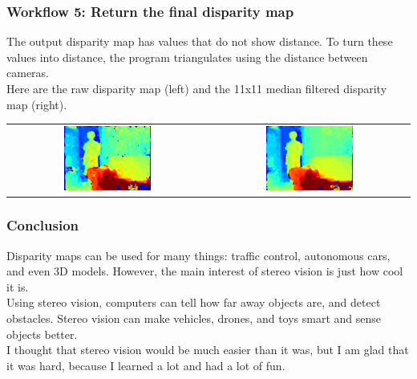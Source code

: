 \documentclass[19pt]{beamer}
\begin{document}
\begin{frame}
\frametitle{Workflow 5: Return the final disparity map}

\vspace*{10pt}
The output disparity map has values that do not show distance. To turn these values into distance, the program triangulates using the distance between cameras.\\[10pt]
%
Here are the raw disparity map (left) and the 11x11 median filtered disparity map (right).

\begin{center}
\setlength{}
\begin{tabular}{cc}
\includegraphics[width=0.45\textwidth]{images/res.png} &
\includegraphics[width=0.45\textwidth]{images/nomedres.png} \\
\end{tabular}
\end{center}

\end{frame}


\begin{frame}
\frametitle{Conclusion}

Disparity maps can be used for many things: traffic control, autonomous cars, and even 3D models. However, the main interest of stereo vision is just how cool it is. \\[10pt]
%
Using stereo vision, computers can tell how far away objects are, and detect obstacles. Stereo vision can make vehicles, drones, and toys smart and sense objects better.\\[10pt]
%
I thought that stereo vision would be much easier than it was, but I am glad that it was hard, because I learned a lot and had a lot of fun.
\end{frame}
\end{document}
